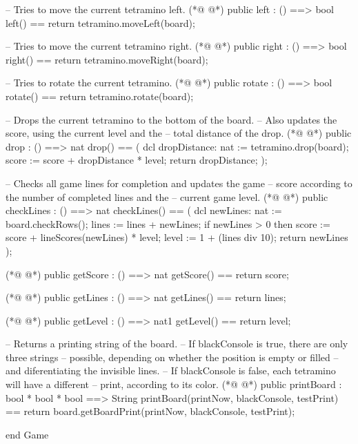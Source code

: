 \begin{vdmpp}[breaklines=true]
    -- Tries to move the current tetramino left.
(*@
\label{left:77}
@*)
  public left : () ==> bool
  left() ==
   return tetramino.moveLeft(board);

    -- Tries to move the current tetramino right.
(*@
\label{right:82}
@*)
  public right : () ==> bool
  right() ==
   return tetramino.moveRight(board);
   
    -- Tries to rotate the current tetramino.
(*@
\label{rotate:87}
@*)
  public rotate : () ==> bool
  rotate() ==
   return tetramino.rotate(board);

    -- Drops the current tetramino to the bottom of the board. 
    -- Also updates the score, using the current level and the
    -- total distance of the drop. 
(*@
\label{drop:94}
@*)
  public drop : () ==> nat
  drop() == (
   dcl dropDistance: nat := tetramino.drop(board);
   score := score + dropDistance * level;
   return dropDistance;
  );
  
  -- Checks all game lines for completion and updates the game
  -- score according to the number of completed lines and the
  -- current game level.
(*@
\label{checkLines:104}
@*)
  public checkLines : () ==> nat
  checkLines() == (
   dcl newLines: nat := board.checkRows();
   lines := lines + newLines;
   if newLines > 0 then score := score + lineScores(newLines) * level;
   level := 1 + (lines div 10);
   return newLines
  );

(*@
\label{getScore:113}
@*)
  public getScore : () ==> nat
  getScore() == return score;
   
(*@
\label{getLines:116}
@*)
  public getLines : () ==> nat
  getLines() == return lines;

(*@
\label{getLevel:119}
@*)
  public getLevel : () ==> nat1
  getLevel() == return level;
  
  -- Returns a printing string of the board.
  -- If blackConsole is true, there are only three strings
  -- possible, depending on whether the position is empty or filled
  -- and diferentiating the invisible lines.
  -- If blackConsole is false, each tetramino will have a different
  -- print, according to its color.
(*@
\label{printBoard:128}
@*)
  public printBoard : bool * bool * bool ==> String
  printBoard(printNow, blackConsole, testPrint) == 
   return board.getBoardPrint(printNow, blackConsole, testPrint);
   
end Game
\end{vdmpp}
\bigskip
